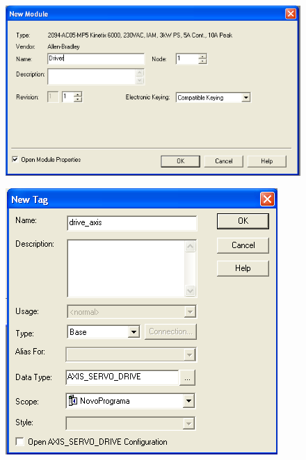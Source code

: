 \documentclass[a4paper,11pt]{scrartcl} %
\numberwithin{equation}{section} %
\numberwithin{figure}{section} %
\numberwithin{table}{section} %
\begin{document}
\begin{enumerate}
 	\begin{minipage}[!ht]{\linewidth}
      \centering
      \begin{minipage}{0.45\linewidth}
          \begin{figure}[H]
              \includegraphics[width=\linewidth]{figures/software/step04}
          \end{figure}
      \end{minipage}
      \hspace{0.05\linewidth}
      \begin{minipage}{0.45\linewidth}
          \begin{figure}[H]
              \includegraphics[width=\linewidth]{figures/software/step05}

\end{figure}
\end{minipage}
\end{minipage}
\end{enumerate}
\end{document}
